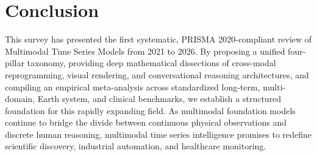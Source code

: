 \section{Conclusion}
\label{sec:conclusion}
This survey has presented the first systematic, PRISMA 2020-compliant review of Multimodal Time Series Models from 2021 to 2026. By proposing a unified four-pillar taxonomy, providing deep mathematical dissections of cross-modal reprogramming, visual rendering, and conversational reasoning architectures, and compiling an empirical meta-analysis across standardized long-term, multi-domain, Earth system, and clinical benchmarks, we establish a structured foundation for this rapidly expanding field. As multimodal foundation models continue to bridge the divide between continuous physical observations and discrete human reasoning, multimodal time series intelligence promises to redefine scientific discovery, industrial automation, and healthcare monitoring.
